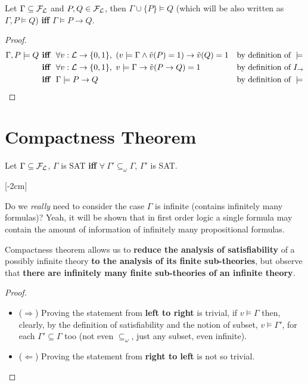 	\begin{lemma} Let $\Gamma \subseteq \mathcal{F}_\mathcal{L}$ and $P,Q \in \mathcal{F}_\mathcal{L}$, then $\Gamma \cup \{P\} \models Q$ (which will be also written as $\Gamma, P \models Q$) \textbf{iff} $\Gamma \models P \rightarrow Q$.
	\end{lemma}
	\begin{proof}
	  	\begin{align*}
		  \Gamma, P \models Q &\textbf{ iff } \ \forall v: \mathcal{L} \rightarrow \{0,1\}, \ (v \models \Gamma \wedge \tilde{v} (P) = 1) \rightarrow \tilde{v} (Q) = 1 & & \text{by definition of } \models \\
		  &\textbf{ iff } \ \forall v: \mathcal{L} \rightarrow \{0,1\}, \ v \models \Gamma \rightarrow \tilde{v} (P \rightarrow Q) = 1 & & \text{by definition of } I_\rightarrow \\
		  &\textbf{ iff } \ \Gamma \models P \rightarrow Q & & \text{by definition of } \models
		\end{align*}
	\end{proof}

	\section{Compactness Theorem}
	\begin{theorem} \hspace{1cm}
	\begin{center}
	  Let $\Gamma \subseteq \mathcal{F}_\mathcal{L}$, $\Gamma$ is SAT \textbf{iff} $\forall \ \Gamma' \subseteq_\omega \Gamma$,  $\Gamma'$ is SAT. 
	\end{center}
	\end{theorem} [-2cm]

	Do we \textit{really} need to consider the case $\Gamma$ is infinite (contains infinitely many formulas)? Yeah, it will be shown that in first order logic a single formula may contain the amount of information of infinitely many propositional formulas.

	Compactness theorem allows us to \textbf{reduce the analysis of satisfiability} of a possibly infinite theory \textbf{to the analysis of its finite sub-theories}, but observe that \textbf{there are infinitely many finite sub-theories of an infinite theory}.

	\begin{proof} \hspace{1cm}
	  \begin{itemize}
		\item ($\Rightarrow$) Proving the statement from \textbf{left to right} is trivial, if $v \models \Gamma$ then, clearly, by the definition of satisfiability and the notion of subset, $v \models \Gamma'$, for each $\Gamma' \subseteq \Gamma$ too (not even $\subseteq_\omega$, just any subset, even infinite).

		\item ($\Leftarrow$) Proving the statement from \textbf{right to left} is not so trivial.
	  \end{itemize}
	\end{proof}


